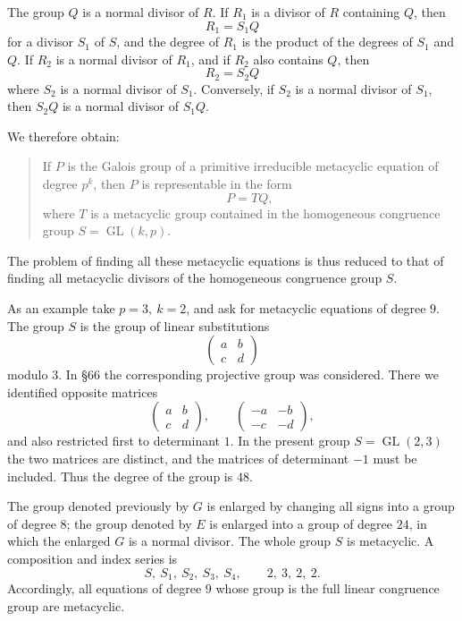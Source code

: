\documentclass[12pt,a4paper]{article}
\newcommand{\GL}{\operatorname{GL}}
\begin{document}
The group \(Q\) is a normal divisor of \(R\).  If \(R_1\) is a divisor of \(R\) containing \(Q\), then
\[
 R_1=S_1Q
\]
for a divisor \(S_1\) of \(S\), and the degree of \(R_1\) is the product of the degrees of \(S_1\) and \(Q\).  If \(R_2\) is a normal divisor of \(R_1\), and if \(R_2\) also contains \(Q\), then
\[
 R_2=S_2Q
\]
where \(S_2\) is a normal divisor of \(S_1\).  Conversely, if \(S_2\) is a normal divisor of \(S_1\), then \(S_2Q\) is a normal divisor of \(S_1Q\).

We therefore obtain:

\begin{quote}
If \(P\) is the Galois group of a primitive irreducible metacyclic equation of degree \(p^k\), then \(P\) is representable in the form
\[
 P=TQ,
\]
where \(T\) is a metacyclic group contained in the homogeneous congruence group \(S=\GL(k,p)\).
\end{quote}

The problem of finding all these metacyclic equations is thus reduced to that of finding all metacyclic divisors of the homogeneous congruence group \(S\).

As an example take \(p=3,\ k=2\), and ask for metacyclic equations of degree \(9\).  The group \(S\) is the group of linear substitutions
\[
 \begin{pmatrix}a&b\\ c&d\end{pmatrix}
\]
modulo \(3\).  In \S 66 the corresponding projective group was considered.  There we identified opposite matrices
\[
 \begin{pmatrix}a&b\\ c&d\end{pmatrix},
 \qquad
 \begin{pmatrix}-a&-b\\ -c&-d\end{pmatrix},
\]
and also restricted first to determinant \(1\).  In the present group \(S=\GL(2,3)\) the two matrices are distinct, and the matrices of determinant \(-1\) must be included.  Thus the degree of the group is \(48\).

The group denoted previously by \(G\) is enlarged by changing all signs into a group of degree \(8\); the group denoted by \(E\) is enlarged into a group of degree \(24\), in which the enlarged \(G\) is a normal divisor.  The whole group \(S\) is metacyclic.  A composition and index series is
\[
 S,\ S_1,\ S_2,\ S_3,\ S_4,
 \qquad
 2,\ 3,\ 2,\ 2.
\]
Accordingly, all equations of degree \(9\) whose group is the full linear congruence group are metacyclic.
\end{document}
